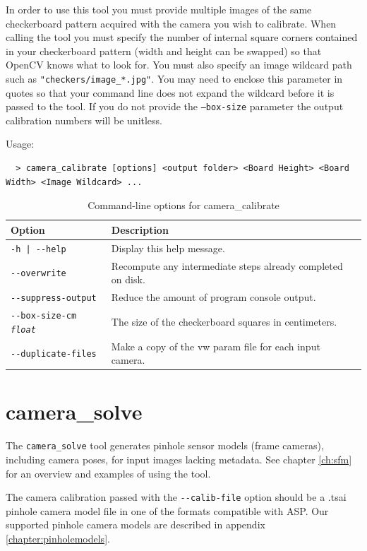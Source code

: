 In order to use this tool you must provide multiple images of the same checkerboard pattern acquired with
the camera you wish to calibrate.  When calling the tool you must specify the number of internal square corners
contained in your checkerboard pattern (width and height can be swapped) so that OpenCV knows what to look for.
You must also specify an image wildcard path such as \texttt{"checkers/image\_*.jpg"}.  You may need to enclose this
parameter in quotes so that your command line does not expand the wildcard before it is passed to the tool.
If you do not provide the \texttt{--box-size} parameter the output calibration numbers will be unitless.

Usage:
\begin{verbatim}
  > camera_calibrate [options] <output folder> <Board Height> <Board Width> <Image Wildcard> ...
\end{verbatim}

\begin{longtable}{|l|p{7.5cm}|}
\caption{Command-line options for camera\_calibrate}
\label{tbl:cameracalibrate}
\endfirsthead
\endhead
\endfoot
\endlastfoot
\hline
Option & Description \\ \hline \hline
\texttt{-h | -\/-help } & Display this help message.\\ \hline
\texttt{-\/-overwrite}  & Recompute any intermediate steps already completed on disk.\\ \hline
\texttt{-\/-suppress-output} & Reduce the amount of program console output.\\ \hline
\texttt{-\/-box-size-cm  \textit{float}} & The size of the checkerboard squares in centimeters.\\ \hline
\texttt{-\/-duplicate-files} & Make a copy of the vw param file for each input camera.\\ \hline
\end{longtable}

\section{camera\_solve}
\label{camerasolve}

The \texttt{camera\_solve} tool generates pinhole sensor models (frame
cameras), including camera poses, for input images lacking metadata.  See chapter
\ref{ch:sfm} for an overview and examples of using the tool.

The camera calibration passed with the \texttt{-\/-calib-file} option
 should be a .tsai pinhole camera model file in one of the formats
compatible with ASP.  Our supported pinhole camera models are described
in appendix \ref{chapter:pinholemodels}.


